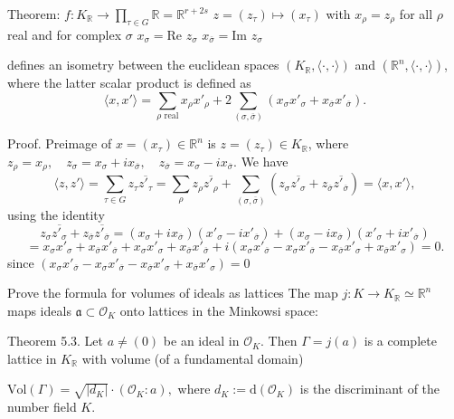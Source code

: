 Theorem:
\(f: K_{\mathbb{R}} \to \prod_{\tau \in G} \mathbb{R} = \mathbb{R}^{r+2s}\)
\(z = (z_{\tau}) \mapsto (x_{\tau})\)
with
\(x_{\rho} = z_{\rho}\) for all \( \rho \) real
and for complex \( \sigma \)
\(x_{\sigma} = \text{Re } z_{\sigma}\)
\(x_{\overline{\sigma}} = \text{Im } z_{\sigma}\)

defines an isometry between the euclidean spaces \((K_{\mathbb{R}}, \langle \cdot, \cdot \rangle)\) and 
\((\mathbb{R}^n, \langle \cdot, \cdot \rangle)\), where the latter scalar product is defined as
\[
\langle x, x' \rangle = \sum_{\rho \text{ real}} x_{\rho} x'_{\rho} + 2 \sum_{(\sigma, \overline{\sigma})} (x_{\sigma} x'_{\sigma} + x_{\overline{\sigma}} x'_{\overline{\sigma}}).
\]

Proof. 
Preimage of \(x = (x_{\tau}) \in \mathbb{R}^n\) is \(z = (z_{\tau}) \in K_{\mathbb{R}}\), where
\(z_{\rho} = x_{\rho}, \quad z_{\sigma} = x_{\sigma} + ix_{\overline{\sigma}}, \quad z_{\overline{\sigma}} = x_{\sigma} - ix_{\overline{\sigma}}.\)
We have
\[
\langle z, z' \rangle = \sum_{\tau \in G} z_{\tau} \overline{z'_{\tau}} = \sum_{\rho} z_{\rho} \overline{z'_{\rho}} + \sum_{(\sigma, \overline{\sigma})} (z_{\sigma} \overline{z'_{\sigma}} + z_{\overline{\sigma}} \overline{z'_{\overline{\sigma}}}) = \langle x, x' \rangle,
\]
using the identity
\[
z_{\sigma} \overline{z'_{\sigma}} + z_{\overline{\sigma}} \overline{z'_{\overline{\sigma}}} = (x_{\sigma} + ix_{\overline{\sigma}})(x'_{\sigma} - ix'_{\overline{\sigma}}) + (x_{\sigma} - ix_{\overline{\sigma}})(x'_{\sigma} + ix'_{\overline{\sigma}})
\]
\[
= x_{\sigma} x'_{\sigma} + x_{\overline{\sigma}} x'_{\overline{\sigma}} + x_{\sigma} x'_{\sigma} + x_{\overline{\sigma}} x'_{\overline{\sigma}} + i(x_{\sigma} x'_{\overline{\sigma}} - x_{\sigma} x'_{\overline{\sigma}} - x_{\overline{\sigma}} x'_{\sigma} + x_{\overline{\sigma}} x'_{\sigma}) = 0. 
\]
since 
\((x_{\sigma} x'_{\overline{\sigma}} - x_{\sigma} x'_{\overline{\sigma}} - x_{\overline{\sigma}} x'_{\sigma} + x_{\overline{\sigma}} x'_{\sigma}) = 0\)


Prove the formula for volumes of ideals as lattices
The map \( j : K → K_{\mathbb{R}} \simeq \mathbb{R}^n \) maps ideals \( \mathfrak{a} \subset \mathcal{O}_K \) onto lattices in the Minkowsi space:

Theorem 5.3. 
Let \( a \neq (0) \) be an ideal in \( \mathcal{O}_K \). 
Then \( \Gamma = j(a) \) is a complete lattice in \( K_{\mathbb{R}} \) with volume (of a fundamental domain)

\(
\text{Vol}(\Gamma) = \sqrt{|d_K|} \cdot (\mathcal{O}_K : a),
\)
where \( d_K := \text{d}(\mathcal{O}_K) \) is the discriminant of the number field \( K \).

